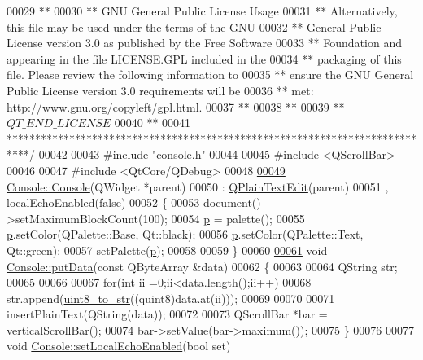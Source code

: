 \begin{DoxyCode}
00029 \textcolor{comment}{**}
00030 \textcolor{comment}{** GNU General Public License Usage}
00031 \textcolor{comment}{** Alternatively, this file may be used under the terms of the GNU}
00032 \textcolor{comment}{** General Public License version 3.0 as published by the Free Software}
00033 \textcolor{comment}{** Foundation and appearing in the file LICENSE.GPL included in the}
00034 \textcolor{comment}{** packaging of this file.  Please review the following information to}
00035 \textcolor{comment}{** ensure the GNU General Public License version 3.0 requirements will be}
00036 \textcolor{comment}{** met: http://www.gnu.org/copyleft/gpl.html.}
00037 \textcolor{comment}{**}
00038 \textcolor{comment}{**}
00039 \textcolor{comment}{** $QT\_END\_LICENSE$}
00040 \textcolor{comment}{**}
00041 \textcolor{comment}{****************************************************************************/}
00042 
00043 \textcolor{preprocessor}{#include "\hyperlink{a00033}{console.h}"}
00044 
00045 \textcolor{preprocessor}{#include <QScrollBar>}
00046 
00047 \textcolor{preprocessor}{#include <QtCore/QDebug>}
00048 
\hypertarget{a00032_source_l00049}{}\hyperlink{a00002_a1219e6e2000327a02434c56c514bbeda}{00049} \hyperlink{a00002_a1219e6e2000327a02434c56c514bbeda}{Console::Console}(QWidget *parent)
00050     : \hyperlink{a00011}{QPlainTextEdit}(parent)
00051     , localEchoEnabled(false)
00052 \{
00053     document()->setMaximumBlockCount(100);
00054     \hyperlink{a00002_a097b52858dc4b9f1bec8d8d67518daf0}{p} = palette();
00055     \hyperlink{a00002_a097b52858dc4b9f1bec8d8d67518daf0}{p}.setColor(QPalette::Base, Qt::black);
00056     \hyperlink{a00002_a097b52858dc4b9f1bec8d8d67518daf0}{p}.setColor(QPalette::Text, Qt::green);
00057     setPalette(\hyperlink{a00002_a097b52858dc4b9f1bec8d8d67518daf0}{p});
00058 
00059 \}
00060 
\hypertarget{a00032_source_l00061}{}\hyperlink{a00002_aa744a0868e01a13a502710f895f01525}{00061} \textcolor{keywordtype}{void} \hyperlink{a00002_aa744a0868e01a13a502710f895f01525}{Console::putData}(\textcolor{keyword}{const} QByteArray &data)
00062 \{
00063 
00064     QString str;
00065 
00066 
00067     \textcolor{keywordflow}{for}(\textcolor{keywordtype}{int} ii =0;ii<data.length();ii++)
00068         str.append(\hyperlink{a00002_a9194022b884875614a4f7056454881c1}{uint8\_to\_str}((quint8)data.at(ii)));
00069 
00070 
00071     insertPlainText(QString(data));
00072 
00073     QScrollBar *bar = verticalScrollBar();
00074     bar->setValue(bar->maximum());
00075 \}
00076 
\hypertarget{a00032_source_l00077}{}\hyperlink{a00002_a5a17c5b6bc6719a26f73a5d0ac3d7de1}{00077} \textcolor{keywordtype}{void} \hyperlink{a00002_a5a17c5b6bc6719a26f73a5d0ac3d7de1}{Console::setLocalEchoEnabled}(\textcolor{keywordtype}{bool} set)

\end{DoxyCode}

